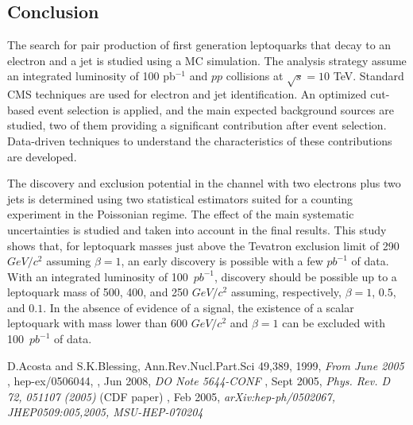 \documentclass{cmspaper}
\begin{document}
\begin{linenumbers}
\section{Conclusion}

The search for pair production of first generation leptoquarks that decay to
an electron and a jet is studied using a MC simulation.
The analysis strategy 
assume an integrated luminosity of 100 pb$^{-1}$ and $pp$ collisions 
at $\sqrt{s}=10$ TeV.
Standard CMS techniques are used for electron and jet identification. 
An optimized cut-based event selection is applied, and the main expected background 
sources are studied, two of them providing 
a significant contribution after event selection. 
Data-driven techniques to understand the characteristics of these contributions are developed.

The discovery and exclusion potential in the channel with two electrons plus two jets is
 determined using two statistical estimators suited for a counting experiment in the Poissonian regime.
The effect of the main systematic uncertainties 
is studied and taken into account in the final 
results. This study shows that, 
for leptoquark masses just above the Tevatron exclusion limit of 290~$GeV/c^2$
 assuming $\beta=1$, 
an early discovery is possible with a few $pb^{-1}$ of data.
With an integrated luminosity of 100~$pb^{-1}$, discovery should be possible up
to a leptoquark mass of 500, 400, and 250 $GeV/c^2$ assuming, respectively, 
$\beta=1$, $0.5$, and $0.1$. 
In the absence of evidence of a signal, the existence of a scalar leptoquark 
with mass lower than 600 $GeV/c^2$ 
and $\beta=1$ can be excluded with 100~$pb^{-1}$ of data.



\begin{thebibliography}{}

 {D.Acosta and S.K.Blessing, Ann.Rev.Nucl.Part.Sci 49,389},
  1999,
  {\em From June 2005}
, hep-ex/0506044,
, Jun 2008,
  {\em DO Note 5644-CONF}
, Sept 2005,
  {\em Phys. Rev. D 72, 051107 (2005)} (CDF paper)
, Feb 2005,
  {\em arXiv:hep-ph/0502067, JHEP0509:005,2005, MSU-HEP-070204}
  

\end{thebibliography}
\end{linenumbers}
\end{document}
